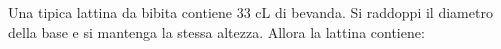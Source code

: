 Una tipica lattina da bibita contiene 33 cL di bevanda. 
Si raddoppi il diametro della base e si mantenga la stessa altezza. 
Allora la lattina contiene:

